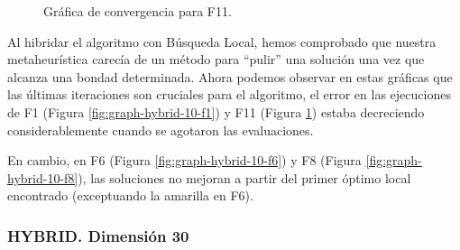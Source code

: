 \documentclass{article}
\begin{document}
\begin{figure}[H]
	\centering
	\caption{Gráfica de convergencia para F11.}
	\label{fig:graph-hybrid-10-f11}
\end{figure}

Al hibridar el algoritmo con Búsqueda Local, hemos comprobado que nuestra metaheurística carecía de un método para ``pulir'' una
solución una vez que alcanza una bondad determinada. Ahora podemos observar en estas gráficas que las últimas iteraciones son
cruciales para el algoritmo, el error en las ejecuciones de F1 (Figura \ref{fig:graph-hybrid-10-f1}) y F11
(Figura \ref{fig:graph-hybrid-10-f11}) estaba decreciendo considerablemente cuando se agotaron las evaluaciones. 

En cambio, en F6 (Figura \ref{fig:graph-hybrid-10-f6}) y F8 (Figura \ref{fig:graph-hybrid-10-f8}), las soluciones no mejoran
a partir del primer óptimo local encontrado (exceptuando la amarilla en F6).

\subsubsection*{HYBRID. Dimensión 30}
\end{document}
